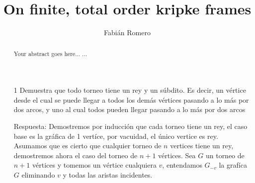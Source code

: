 \documentclass[12pt]{article}
\title{ On finite, total order kripke frames }
\author{Fabián Romero}
\date{}
\begin{document}
\maketitle

\begin{abstract}
Your abstract goes here...
...
\end{abstract}

\begin{itemize}
  \item[1] Demuestra que todo torneo tiene un rey y un súbdito. Es decir, un vértice desde el cual se puede llegar a todos los demás vértices pasando a lo más por dos arcos, y uno al cual todos pueden llegar pasando a lo más por dos arcos

  \item[Respuesta:] Demostremos por inducción que cada torneo tiene un rey, el caso base es la gráfica de 1 vertíce, por vacuidad, el único vertice es rey.\\
    Asumamos que es cierto que cualquier torneo de $n$ vertices tiene un rey, demostremos ahora el caso del torneo de $n+1$ vértices.
    Sea $G$ un torneo de $n+1$ vértices y tomemos un vértice cualquiera $v$, entendamos $G_{-v}$ la grafíca $G$ eliminando $v$ y todas las aristas incidentes.



\end{itemize}
\end{document}
